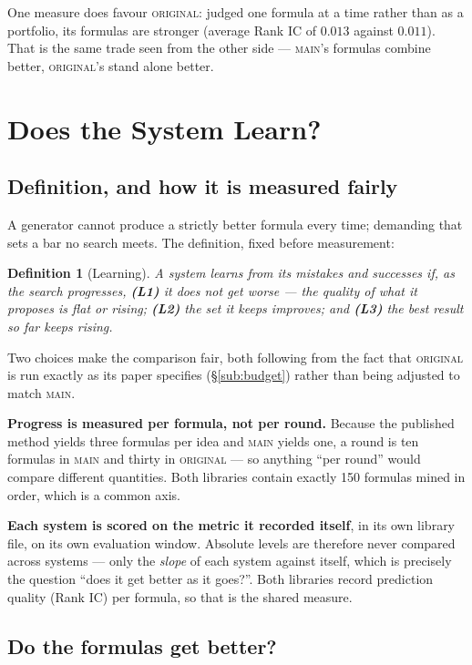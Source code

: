 \documentclass[11pt]{article}
\newtheorem{definition}{Definition}
\newcommand{\main}{\textsc{main}}
\newcommand{\orig}{\textsc{original}}
\begin{document}
One measure does favour \orig{}: judged one formula at a time rather than as a
portfolio, its formulas are stronger (average Rank IC of $0.013$ against $0.011$).
That is the same trade seen from the other side ---
\main{}'s formulas combine better, \orig{}'s stand alone better.


\section{Does the System Learn?}
\label{sec:learning}

\subsection{Definition, and how it is measured fairly}

A generator cannot produce a strictly better formula every time; demanding that sets a
bar no search meets. The definition, fixed before measurement:

\begin{definition}[Learning]
\label{def:learning}
A system learns from its mistakes and successes if, as the search progresses,
\textbf{(L1)} it does not get worse --- the quality of what it proposes is flat or
rising; \textbf{(L2)} the set it keeps improves; and \textbf{(L3)} the best result so
far keeps rising.
\end{definition}

\noindent Two choices make the comparison fair, both following from the fact that
\orig{} is run exactly as its paper specifies (\S\ref{sub:budget}) rather than being
adjusted to match \main{}.

\textbf{Progress is measured per formula, not per round.} Because the published method
yields three formulas per idea and \main{} yields one, a round is ten formulas in
\main{} and thirty in \orig{} --- so anything ``per round'' would compare different
quantities. Both libraries contain exactly 150 formulas mined in order, which is a
common axis.

\textbf{Each system is scored on the metric it recorded itself}, in its own library
file, on its own evaluation window. Absolute levels are therefore never compared across
systems --- only the \emph{slope} of each system against itself, which is precisely the
question ``does it get better as it goes?''. Both libraries record prediction quality
(Rank IC) per formula, so that is the shared measure.

\subsection{Do the formulas get better?}
\end{document}
